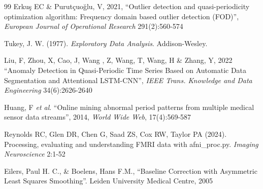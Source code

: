 \documentclass[twoside,twocolumn]{article}
\begin{document}
\begin{thebibliography}{99}
	 Erku\c{s} EC \& Purut\c{c}uo\u{g}lu, V, 2021, ``Outlier detection and quasi-periodicity optimization algorithm: Frequency domain based outlier detection (FOD)'', {\em European Journal of Operational Research} 291(2):560-574
	
	 Tukey, J. W. (1977). {\em Exploratory Data Analysis}. Addison-Wesley. 
	
	 Liu, F, Zhou, X, Cao, J, Wang , Z, Wang, T, Wang, H \& Zhang, Y, 2022 ``Anomaly Detection in Quasi-Periodic Time Series Based on Automatic Data Segmentation and Attentional LSTM-CNN'', {\em IEEE Trans. Knowledge and Data Engineering} 34(6):2626-2640
	
	 Huang, F {\em et al}. ``Online mining abnormal period patterns from multiple medical sensor data streams'', 2014, {\em World Wide Web}, 17(4):569-587
	
	 Reynolds RC, Glen DR, Chen G, Saad ZS, Cox RW, Taylor PA (2024). Processing, evaluating and understanding FMRI data with afni\_proc.py. {\em Imaging Neuroscience} 2:1-52
	
	 Eilers, Paul H. C., \& Boelens, Hans F.M., ``Baseline Correction with Asymmetric Least Squares Smoothing''. Leiden University Medical Centre, 2005
	
	
\end{thebibliography}

\end{document}
